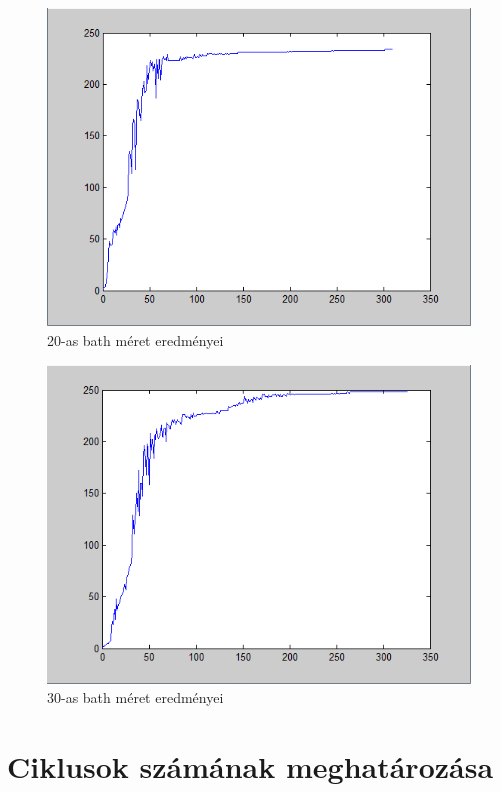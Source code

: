 \begin{figure}
\centering

\includegraphics[scale=0.5]{images/Teszt8}
\caption{20-as bath méret eredményei}

\label{fig:batchsize2}
\end{figure}

\begin{figure}
\centering

\includegraphics[scale=0.5]{images/Teszt9}
\caption{30-as bath méret eredményei}

\label{fig:batchsize3}
\end{figure}

\section{Ciklusok számának meghatározása}

